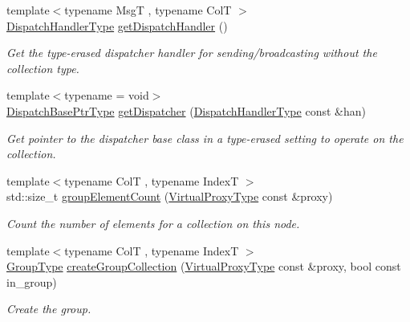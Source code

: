 \begin{DoxyCompactItemize}
{\footnotesize template$<$typename MsgT , typename ColT $>$ }\\\hyperlink{structvt_1_1vrt_1_1collection_1_1_collection_manager_a0cfe02a0426e95ec9daa2ef7374e07c7}{Dispatch\+Handler\+Type} \hyperlink{structvt_1_1vrt_1_1collection_1_1_collection_manager_ab672ad6c3bc9fdc5a9577a9ae0677d1f}{get\+Dispatch\+Handler} ()
\begin{DoxyCompactList}\small\item\em Get the type-\/erased dispatcher handler for sending/broadcasting without the collection type. \end{DoxyCompactList}\item 
{\footnotesize template$<$typename  = void$>$ }\\\hyperlink{namespacevt_1_1vrt_1_1collection_aa3b9731ae16d60fac43d68840f3606a5}{Dispatch\+Base\+Ptr\+Type} \hyperlink{structvt_1_1vrt_1_1collection_1_1_collection_manager_af183a018e0d2d8b3ed024244d8f83f45}{get\+Dispatcher} (\hyperlink{structvt_1_1vrt_1_1collection_1_1_collection_manager_a0cfe02a0426e95ec9daa2ef7374e07c7}{Dispatch\+Handler\+Type} const \&han)
\begin{DoxyCompactList}\small\item\em Get pointer to the dispatcher base class in a type-\/erased setting to operate on the collection. \end{DoxyCompactList}\item 
{\footnotesize template$<$typename ColT , typename IndexT $>$ }\\std\+::size\+\_\+t \hyperlink{structvt_1_1vrt_1_1collection_1_1_collection_manager_a93b0cf22a65db97cd5816c01191b9d8d}{group\+Element\+Count} (\hyperlink{namespacevt_a1b417dd5d684f045bb58a0ede70045ac}{Virtual\+Proxy\+Type} const \&proxy)
\begin{DoxyCompactList}\small\item\em Count the number of elements for a collection on this node. \end{DoxyCompactList}\item 
{\footnotesize template$<$typename ColT , typename IndexT $>$ }\\\hyperlink{namespacevt_a27b5e4411c9b6140c49100e050e2f743}{Group\+Type} \hyperlink{structvt_1_1vrt_1_1collection_1_1_collection_manager_a05de48c4386d84532b19a96b0cefc172}{create\+Group\+Collection} (\hyperlink{namespacevt_a1b417dd5d684f045bb58a0ede70045ac}{Virtual\+Proxy\+Type} const \&proxy, bool const in\+\_\+group)
\begin{DoxyCompactList}\small\item\em Create the group. \end{DoxyCompactList}\item 

\end{DoxyCompactItemize}
